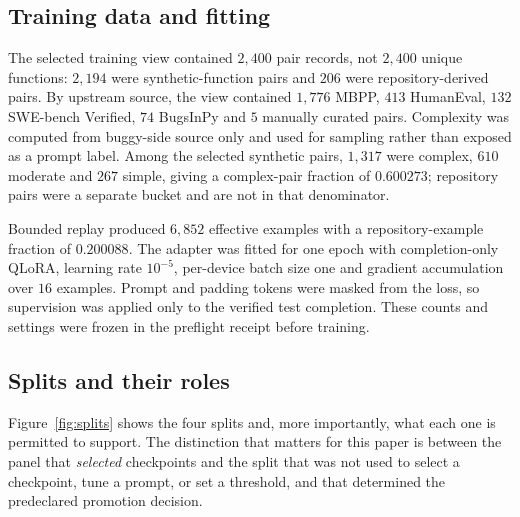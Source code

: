 \documentclass[10pt,conference]{IEEEtran}
\begin{document}
\subsection{Training data and fitting}

The selected training view contained $2{,}400$ pair records, not $2{,}400$
unique functions: $2{,}194$ were synthetic-function pairs and $206$ were
repository-derived pairs. By upstream source, the view contained $1{,}776$
MBPP, $413$ HumanEval, $132$ SWE-bench Verified, $74$ BugsInPy and $5$
manually curated pairs. Complexity was computed from buggy-side source only and
used for sampling rather than exposed as a prompt label. Among the selected
synthetic pairs, $1{,}317$ were complex, $610$ moderate and $267$ simple, giving
a complex-pair fraction of $0.600273$; repository pairs were a separate bucket
and are not in that denominator.

Bounded replay produced $6{,}852$ effective examples with a repository-example
fraction of $0.200088$. The adapter was fitted for one epoch with completion-only
QLoRA, learning rate $10^{-5}$, per-device batch size one and gradient
accumulation over $16$ examples. Prompt and padding tokens were masked from the
loss, so supervision was applied only to the verified test completion. These
counts and settings were frozen in the preflight receipt before training.

\subsection{Splits and their roles}

Figure~\ref{fig:splits} shows the four splits and, more importantly, what each
one is permitted to support. The distinction that matters for this paper is
between the panel that \emph{selected} checkpoints and the split that was not
used to select a checkpoint, tune a prompt, or set a threshold, and that
determined the predeclared promotion decision.
\end{document}
